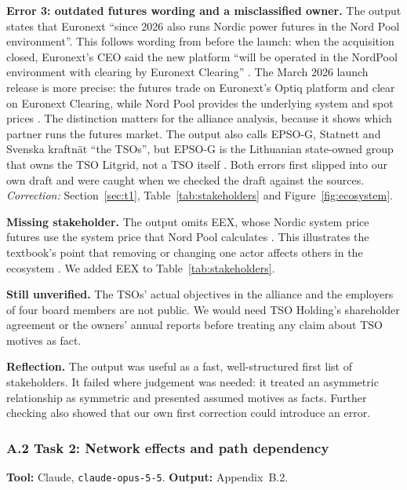 \textbf{Error 3: outdated futures wording and a misclassified owner.}
The output states that Euronext ``since 2026 also runs
Nordic power futures in the Nord Pool environment''.
This follows wording from before the launch: when the
acquisition closed, Euronext's CEO said the new platform
``will be operated in the NordPool environment with clearing
by Euronext Clearing'' \citep{FOW2025}. The March 2026
launch release is more precise: the futures trade on
Euronext's Optiq platform and clear on Euronext Clearing,
while Nord Pool provides the underlying system and spot
prices \citep{Euronext2026}. The distinction matters for
the alliance analysis, because it shows which partner runs
the futures market. The output also calls EPSO-G,
Statnett and Svenska kraftnät ``the TSOs'', but EPSO-G
is the Lithuanian state-owned group that owns the TSO
Litgrid, not a TSO itself \citep{EPSOGAbout}.
Both errors first slipped into our own draft and were
caught when we checked the draft against the sources.
\emph{Correction:} Section~\ref{sec:t1},
Table~\ref{tab:stakeholders} and Figure~\ref{fig:ecosystem}.

\textbf{Missing stakeholder.} The output omits EEX,
whose Nordic system price futures use the system price
that Nord Pool calculates \citep{EEX2024}.
This illustrates the textbook's point that removing
or changing one actor affects others in the ecosystem
\citep[Section~4.1]{OverbyAudestad2021}.
We added EEX to Table~\ref{tab:stakeholders}.

\textbf{Still unverified.} The TSOs' actual objectives in
the alliance and the employers of four board members are not
public. We would need TSO Holding's shareholder agreement or
the owners' annual reports before treating any claim about
TSO motives as fact.

\textbf{Reflection.} The output was useful as a fast,
well-structured first list of stakeholders.
It failed where judgement was needed: it treated an
asymmetric relationship as symmetric and presented
assumed motives as facts. Further checking also showed
that our own first correction could introduce an error.

\subsubsection*{A.2 Task 2: Network effects and path dependency}

\textbf{Tool:} Claude, \texttt{claude-opus-5-5}.
\quad \textbf{Output:} Appendix~B.2.

